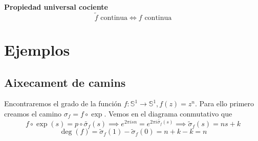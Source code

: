 \documentclass{myclass}
\begin{document}
\begin{minipage}{0.7\textwidth}
\textbf{Propiedad universal cociente}
\[
\tilde{f} \text{ continua}  \iff f \text{ continua}
\] 
\end{minipage}
\begin{minipage}{0.3\textwidth}
\end{minipage}

\section{Ejemplos}
\subsection{Aixecament de camins}
\begin{minipage}{0.8\textwidth}
Encontraremos el grado de la función $f: \mathbb{S}^1 \to \mathbb{S}^1 , f(z)= z^n$. Para ello primero creamos el camino $\sigma_f = f\circ \exp$. Vemos en el diagrama conmutativo que
 \[
f\circ \exp (s) = p \circ \tilde{\sigma _f}(s)  \implies e^{2\pi i s n} = e^{2\pi i \tilde{\sigma _f}(s)} \implies \tilde{\sigma }_f(s) = ns + k 
\] 
\[
\deg(f) = \tilde{\sigma}_f(1)-\tilde{\sigma }_f(0) = n+k-k = n
\] 
\end{minipage}
\begin{minipage}{0.2\textwidth}
\end{minipage}
\end{document}
